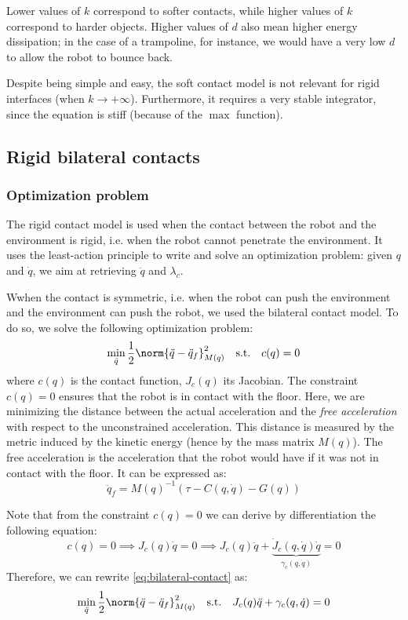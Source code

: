 Lower values of $k$ correspond to softer contacts, while higher values of $k$ correspond to harder objects. Higher values of $d$ also mean higher energy dissipation; in the case of a trampoline, for instance, we would have a very low $d$ to allow the robot to bounce back.

Despite being simple and easy, the soft contact model is not relevant for rigid interfaces (when $k\to+\infty$). Furthermore, it requires a very stable integrator, since the equation is stiff (because of the $\max$ function).

\subsection{Rigid bilateral contacts}
\subsubsection{Optimization problem}
The rigid contact model is used when the contact between the robot and the environment is rigid, i.e. when the robot cannot penetrate the environment. It uses the least-action principle to write and solve an optimization problem: given $q$ and $\dot{q}$, we aim at retrieving $\ddot{q}$ and $\lambda_c$.

Wwhen the contact is symmetric, i.e. when the robot can push the environment and the environment can push the robot, we used the bilateral contact model. To do so, we solve the following optimization problem:
\begin{equation}
    \label{eq:bilateral-contact}
    \min_{\ddot{q}} \frac{1}{2}\norm{\ddot{q}-\ddot{q}_f}^2_{M(q)} \quad\text{s.t.}\quad c(q)=0
\end{equation}
where $c(q)$ is the contact function, $J_c(q)$ its Jacobian. The constraint $c(q)=0$ ensures that the robot is in contact with the floor. Here, we are minimizing the distance between the actual acceleration and the \emph{free acceleration} with respect to the unconstrained acceleration. This distance is measured by the metric induced by the kinetic energy (hence by the mass matrix $M(q)$). The free acceleration is the acceleration that the robot would have if it was not in contact with the floor. It can be expressed as:
\begin{equation*}
    \ddot{q}_f = M(q)^{-1}(\tau - C(q, \dot{q}) - G(q))
\end{equation*}

Note that from the constraint $c(q)=0$ we can derive by differentiation the following equation:
\begin{equation*}
    c(q)=0\implies J_c(q)\dot{q}=0 \implies J_c(q)\ddot{q} + \underbrace{\dot{J}_c(q,\dot{q})\dot{q}}_{\gamma_c(q, \dot{q})} = 0
\end{equation*}
Therefore, we can rewrite \autoref{eq:bilateral-contact} as:
\begin{equation}
    \min_{\ddot{q}} \frac{1}{2}\norm{\ddot{q}-\ddot{q}_f}^2_{M(q)} \quad\text{s.t.}\quad J_c(q)\ddot{q} + \gamma_c(q, \dot{q}) = 0
\end{equation}

